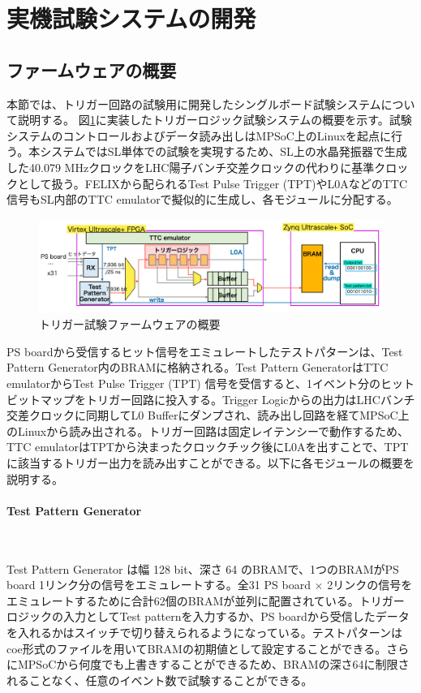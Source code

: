 \section{実機試験システムの開発}
\subsection*{ファームウェアの概要}
本節では、トリガー回路の試験用に開発したシングルボード試験システムについて説明する。
図\ref{TestSystem_Overview}に実装したトリガーロジック試験システムの概要を示す。試験システムのコントロールおよびデータ読み出しはMPSoC上のLinuxを起点に行う。本システムではSL単体での試験を実現するため、SL上の水晶発振器で生成した40.079 MHzクロックをLHC陽子バンチ交差クロックの代わりに基準クロックとして扱う。FELIXから配られるTest Pulse Trigger (TPT)やL0AなどのTTC信号もSL内部のTTC emulatorで擬似的に生成し、各モジュールに分配する。

\begin{figure} 
\centering
\includegraphics[width=16cm]{fig/Test/TestSystem_overview.png}
\caption[トリガー試験ファームウェアの概要]{トリガー試験ファームウェアの概要}
\label{TestSystem_Overview}
\end{figure}

PS boardから受信するヒット信号をエミュレートしたテストパターンは、Test Pattern Generator内のBRAMに格納される。Test Pattern GeneratorはTTC emulatorからTest Pulse Trigger (TPT) 信号を受信すると、1イベント分のヒットビットマップをトリガー回路に投入する。Trigger Logicからの出力はLHCバンチ交差クロックに同期してL0 Bufferにダンプされ、読み出し回路を経てMPSoC上のLinuxから読み出される。トリガー回路は固定レイテンシーで動作するため、TTC emulatorはTPTから決まったクロックチック後にL0Aを出すことで、TPTに該当するトリガー出力を読み出すことができる。以下に各モジュールの概要を説明する。

\paragraph{Test Pattern Generator}　　
\par
Test Pattern Generator は幅 128 bit、深さ 64 のBRAMで、1つのBRAMがPS board 1リンク分の信号をエミュレートする。全31 PS board $\times$ 2リンクの信号をエミュレートするために合計62個のBRAMが並列に配置されている。トリガーロジックの入力としてTest patternを入力するか、PS boardから受信したデータを入れるかはスイッチで切り替えられるようになっている。テストパターンはcoe形式のファイルを用いてBRAMの初期値として設定することができる。さらにMPSoCから何度でも上書きすることができるため、BRAMの深さ64に制限されることなく、任意のイベント数で試験することができる。

